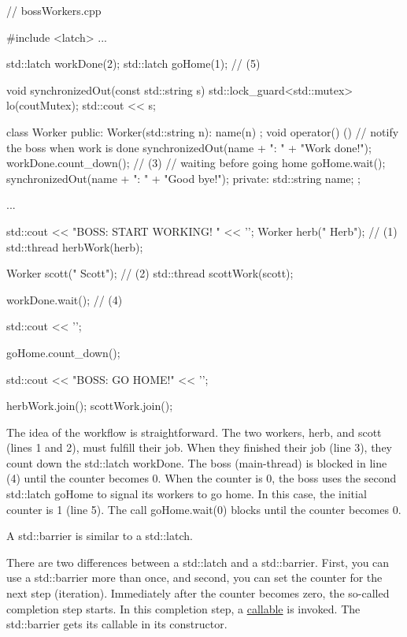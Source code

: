 \begin{cpp}
// bossWorkers.cpp

#include <latch>
...

std::latch workDone(2);
std::latch goHome(1); // (5)

void synchronizedOut(const std::string s) {
	std::lock_guard<std::mutex> lo(coutMutex);
	std::cout << s;
}

class Worker {
public:
	Worker(std::string n): name(n) { };
	void operator() (){
		// notify the boss when work is done
		synchronizedOut(name + ": " + "Work done!\n");
		workDone.count_down(); // (3)
		// waiting before going home
		goHome.wait();
		synchronizedOut(name + ": " + "Good bye!\n");
	}
private:
	std::string name;
};

...

std::cout << "BOSS: START WORKING! " << '\n';
Worker herb("   Herb"); // (1)
std::thread herbWork(herb);

Worker scott("    Scott"); // (2)
std::thread scottWork(scott);

workDone.wait(); // (4)

std::cout << '\n';

goHome.count_down();

std::cout << "BOSS: GO HOME!" << '\n';

herbWork.join();
scottWork.join();
\end{cpp}

The idea of the workflow is straightforward. The two workers, herb, and scott (lines 1 and 2), must fulfill their job. When they finished their job (line 3), they count down the std::latch workDone. The boss (main-thread) is blocked in line (4) until the counter becomes 0. When the counter is 0, the boss uses the second std::latch goHome to signal its workers to go home. In this case, the initial counter is 1 (line 5). The call goHome.wait(0) blocks until the counter becomes 0.


A std::barrier is similar to a std::latch.


There are two differences between a std::latch and a std::barrier. First, you can use a std::barrier more than once, and second, you can set the counter for the next step (iteration). Immediately after the counter becomes zero, the so-called completion step starts. In this completion step, a \href{https://en.cppreference.com/w/cpp/named_req/Callable}{callable} is invoked. The std::barrier gets its callable in its constructor.

